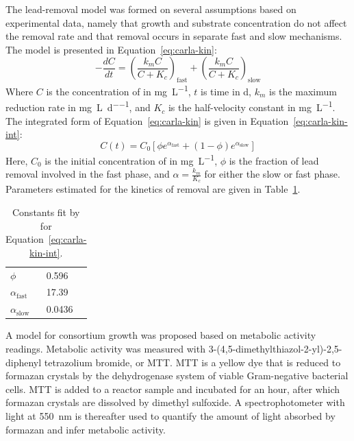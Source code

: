 The lead-removal model was formed on several assumptions based on experimental data, namely that growth and substrate concentration do not affect the removal rate and that removal occurs in separate fast and slow mechanisms. The model is presented in Equation~\ref{eq:carla-kin}: 
\begin{equation}
	-\frac{dC}{dt} = \left( \frac{k_m C }{C + K_c}\right)_\textrm{fast} + \left( \frac{k_m C }{C + K_c}\right)_\textrm{slow} \label{eq:carla-kin}
\end{equation}
Where $ C $ is the concentration of  in \si{\milli\gram\per\liter}, $ t $ is time in \si{\day}, $ k_m $ is the maximum reduction rate in \si{\milli\gram\per\liter\per\day}, and $ K_c $ is the half-velocity constant in \si{\milli\gram\per\liter}. The integrated form of Equation~\ref{eq:carla-kin} is given in Equation~\ref{eq:carla-kin-int}:
\begin{equation}
	C(t) = C_0 \left[ \phi e^{\alpha_\textrm{fast}} +  \left(1 - \phi \right) e^{\alpha_\textrm{slow}} \right] \label{eq:carla-kin-int}
\end{equation}
Here, $ C_0 $ is the initial concentration of  in \si{\milli\gram\per\liter}, $ \phi $ is the fraction of lead removal involved in the fast phase, and $ \alpha = \frac{k_m}{K_c} $ for either the slow or fast phase. Parameters estimated for the kinetics of  removal are given in Table~\ref{tab:carla-pb}.
\begin{table}[htbp!]
	\caption{Constants fit by \textcite{Horstman2019} for Equation~\ref{eq:carla-kin-int}.}
	\label{tab:carla-pb}
	\centering
	\begin{small}
	\begin{tabular}{ll}
		\toprule
		$ \phi $ & 0.596 \\
		$ \alpha_\textrm{fast} $ & 17.39  \\
		$ \alpha_\textrm{slow} $ & 0.0436  \\
		\bottomrule
	\end{tabular}
	\end{small}
\end{table}

A model for consortium growth was proposed based on metabolic activity readings. Metabolic activity  was measured with 3-(4,5-dimethylthiazol-2-yl)-2,5-diphenyl tetrazolium bromide, or MTT. MTT is a yellow dye that is reduced to formazan crystals by the dehydrogenase system of viable Gram-negative bacterial cells. MTT is added to a reactor sample and incubated for an hour, after which formazan crystals are dissolved by dimethyl sulfoxide. A spectrophotometer with light at \SI{550}{\nano\meter} is thereafter used to quantify the amount of light absorbed by formazan and  infer metabolic activity.

